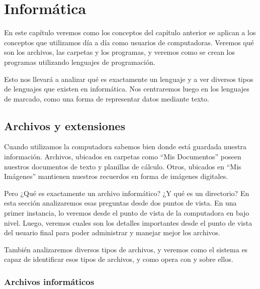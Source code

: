 
\chapter{Informática}
\label{chap:informatica}

En este capítulo veremos como los conceptos del capítulo anterior se aplican a
los conceptos que utilizamos día a día como usuarios de computadoras. Veremos
qué son los archivos, las carpetas y los programas, y veremos como se crean los
programas utilizando lenguajes de programación.

Esto nos llevará a analizar qué es exactamente un lenguaje y a ver diversos
tipos de lenguajes que existen en informática. Nos centraremos luego en los
lenguajes de marcado, como una forma de representar datos mediante texto.

\section{Archivos y extensiones}
\label{chap:informatica:sec:archivos}

Cuando utilizamos la computadora sabemos bien donde está guardada nuestra
información. Archivos, ubicados en carpetas como ``Mis Documentos'' poseen
nuestros documentos de texto y planillas de cálculo. Otros, ubicados en ``Mis
Imágenes'' mantienen nuestros recuerdos en forma de imágenes digitales.

Pero ¿Qué es exactamente un archivo informático? ¿Y qué es un directorio? En
esta sección analizaremos esas preguntas desde dos puntos de vista. En una
primer instancia, lo veremos desde el punto de vista de la computadora en bajo
nivel. Luego, veremos cuales son los detalles importantes desde el punto de
vista del usuario final para poder administrar y manejar mejor los archivos.

También analizaremos diversos tipos de archivos, y veremos como el sistema es
capaz de identificar esos tipos de archivos, y como opera con y sobre ellos.

\subsection{Archivos informáticos}
\label{chap:informatica:subsec:archivos}

